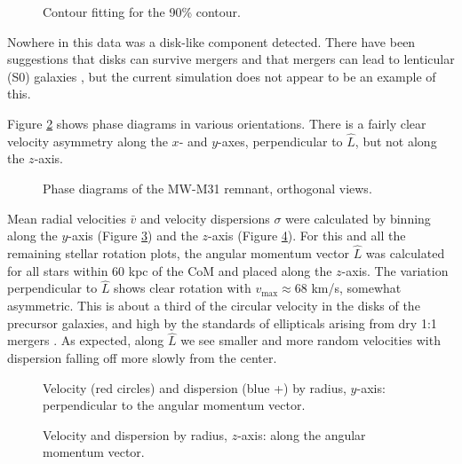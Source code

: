 \documentclass[twocolumn]{aastex63}
\begin{document}
\begin{figure}[htb!]
	\caption{Contour fitting for the 90\% contour.
		\label{fig:isophotes_90}}
\end{figure}

Nowhere in this data was a disk-like component detected. There have been suggestions that disks can survive mergers \citep{hopkins_how_2009, hopkins_how_2009-1} and that mergers can lead to lenticular (S0) galaxies \citep{querejeta_formation_2015}, but the current simulation does not appear to be an example of this.

Figure \ref{fig:rem_phase} shows phase diagrams in various orientations. There is a fairly clear velocity asymmetry along the $x$- and $y$-axes, perpendicular to $\hat{L}$, but not along the $z$-axis.

\begin{figure}[htb!]
	\caption{Phase diagrams of the MW-M31 remnant, orthogonal views.
	\label{fig:rem_phase}}
\end{figure}

Mean radial velocities $\bar{v}$ and velocity dispersions $\sigma$ were calculated by binning along the $y$-axis (Figure \ref{fig:rem_disp_y_801}) and the $z$-axis (Figure \ref{fig:rem_disp_z_801}). For this and all the remaining stellar rotation plots, the angular momentum vector $\hat{L}$ was calculated for all stars within 60 kpc of the CoM and placed along the $z$-axis. The variation perpendicular to $\hat{L}$ shows clear rotation with $v_{\text{max}} \approx 68$ km/s, somewhat asymmetric. This is about a third of the circular velocity in the disks of the precursor galaxies, and high by the standards of ellipticals arising from dry 1:1 mergers \citep{naab_statistical_2003}. As expected, along $\hat{L}$ we see smaller and more random velocities with dispersion falling off more slowly from the center.

\begin{figure}[htb!]
	\caption{Velocity (red circles) and dispersion (blue +) by radius, $y$-axis: perpendicular to the angular momentum vector.
		\label{fig:rem_disp_y_801}}
\end{figure}

\begin{figure}[htb!]
	\caption{Velocity and dispersion by radius, $z$-axis: along the angular momentum vector.
		\label{fig:rem_disp_z_801}}
\end{figure}
\end{document}
